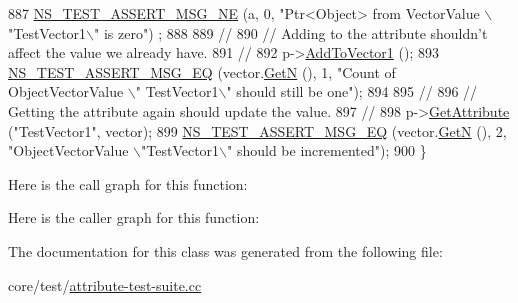 \begin{DoxyCode}
887   \hyperlink{group__testing_ga73d66fb0050a5111453fd144e767b91a}{NS\_TEST\_ASSERT\_MSG\_NE} (a, 0, \textcolor{stringliteral}{"Ptr<Object> from VectorValue \(\backslash\)"TestVector1\(\backslash\)" is zero"})
      ;
888 
889   \textcolor{comment}{//}
890   \textcolor{comment}{// Adding to the attribute shouldn't affect the value we already have.}
891   \textcolor{comment}{//}
892   p->\hyperlink{classAttributeObjectTest_a932bcea4a5820c0214e339cb269d494f}{AddToVector1} ();
893   \hyperlink{group__testing_ga2a9d78cffb3db8e867c35fff0b698cf5}{NS\_TEST\_ASSERT\_MSG\_EQ} (vector.\hyperlink{classns3_1_1ObjectPtrContainerValue_a0b282241030189e3f60e76e52d176710}{GetN} (), 1, \textcolor{stringliteral}{"Count of ObjectVectorValue \(\backslash\)"
      TestVector1\(\backslash\)" should still be one"});
894 
895   \textcolor{comment}{//}
896   \textcolor{comment}{// Getting the attribute again should update the value.}
897   \textcolor{comment}{//}
898   p->\hyperlink{classns3_1_1ObjectBase_a895d1de2f96063d0e0fd78463e7a7e30}{GetAttribute} (\textcolor{stringliteral}{"TestVector1"}, vector);
899   \hyperlink{group__testing_ga2a9d78cffb3db8e867c35fff0b698cf5}{NS\_TEST\_ASSERT\_MSG\_EQ} (vector.\hyperlink{classns3_1_1ObjectPtrContainerValue_a0b282241030189e3f60e76e52d176710}{GetN} (), 2, \textcolor{stringliteral}{"ObjectVectorValue \(\backslash\)"TestVector1\(\backslash\)"
       should be incremented"});
900 \}
\end{DoxyCode}


Here is the call graph for this function\+:




Here is the caller graph for this function\+:




The documentation for this class was generated from the following file\+:\begin{DoxyCompactItemize}
\item 
core/test/\hyperlink{attribute-test-suite_8cc}{attribute-\/test-\/suite.\+cc}\end{DoxyCompactItemize}
